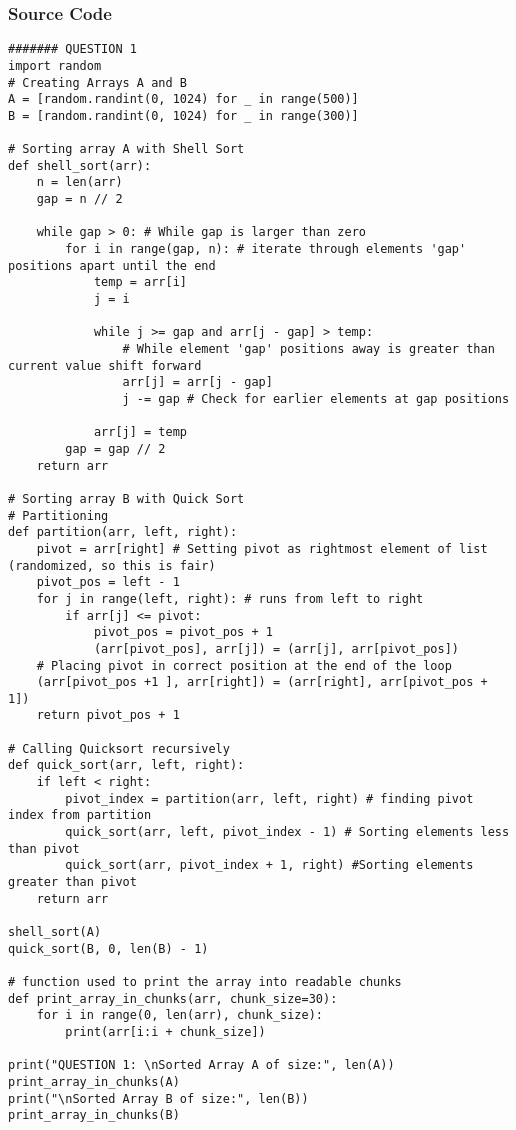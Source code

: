 \documentclass{article}
\begin{document}
\subsubsection*{Source Code}
\begin{lstlisting}
####### QUESTION 1
import random
# Creating Arrays A and B
A = [random.randint(0, 1024) for _ in range(500)]
B = [random.randint(0, 1024) for _ in range(300)]

# Sorting array A with Shell Sort
def shell_sort(arr):
    n = len(arr)
    gap = n // 2

    while gap > 0: # While gap is larger than zero
        for i in range(gap, n): # iterate through elements 'gap' positions apart until the end
            temp = arr[i]
            j = i

            while j >= gap and arr[j - gap] > temp:
                # While element 'gap' positions away is greater than current value shift forward
                arr[j] = arr[j - gap]
                j -= gap # Check for earlier elements at gap positions

            arr[j] = temp
        gap = gap // 2
    return arr

# Sorting array B with Quick Sort
# Partitioning
def partition(arr, left, right):
    pivot = arr[right] # Setting pivot as rightmost element of list (randomized, so this is fair)
    pivot_pos = left - 1
    for j in range(left, right): # runs from left to right
        if arr[j] <= pivot:
            pivot_pos = pivot_pos + 1
            (arr[pivot_pos], arr[j]) = (arr[j], arr[pivot_pos])
    # Placing pivot in correct position at the end of the loop
    (arr[pivot_pos +1 ], arr[right]) = (arr[right], arr[pivot_pos + 1])
    return pivot_pos + 1

# Calling Quicksort recursively
def quick_sort(arr, left, right):
    if left < right:
        pivot_index = partition(arr, left, right) # finding pivot index from partition
        quick_sort(arr, left, pivot_index - 1) # Sorting elements less than pivot
        quick_sort(arr, pivot_index + 1, right) #Sorting elements greater than pivot
    return arr

shell_sort(A)
quick_sort(B, 0, len(B) - 1)

# function used to print the array into readable chunks
def print_array_in_chunks(arr, chunk_size=30):
    for i in range(0, len(arr), chunk_size):
        print(arr[i:i + chunk_size])

print("QUESTION 1: \nSorted Array A of size:", len(A))
print_array_in_chunks(A)
print("\nSorted Array B of size:", len(B))
print_array_in_chunks(B)


\end{lstlisting}
\end{document}
